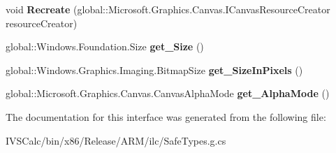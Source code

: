 \begin{DoxyCompactItemize}
void {\bfseries Recreate} (global\+::\+Microsoft.\+Graphics.\+Canvas.\+I\+Canvas\+Resource\+Creator resource\+Creator)
\item 
\mbox{\label{interface_microsoft_1_1_graphics_1_1_canvas_1_1_u_i_1_1_xaml_1_1_i_canvas_virtual_image_source_a8df57b04f7854479d8d5b4d90588a89a}} 
global\+::\+Windows.\+Foundation.\+Size {\bfseries get\+\_\+\+Size} ()
\item 
\mbox{\label{interface_microsoft_1_1_graphics_1_1_canvas_1_1_u_i_1_1_xaml_1_1_i_canvas_virtual_image_source_a94da0f764a564d73c97f33b5fba21363}} 
global\+::\+Windows.\+Graphics.\+Imaging.\+Bitmap\+Size {\bfseries get\+\_\+\+Size\+In\+Pixels} ()
\item 
\mbox{\label{interface_microsoft_1_1_graphics_1_1_canvas_1_1_u_i_1_1_xaml_1_1_i_canvas_virtual_image_source_ad058825143b5833f46d4cf80295da832}} 
global\+::\+Microsoft.\+Graphics.\+Canvas.\+Canvas\+Alpha\+Mode {\bfseries get\+\_\+\+Alpha\+Mode} ()
\end{DoxyCompactItemize}


The documentation for this interface was generated from the following file\+:\begin{DoxyCompactItemize}
\item 
I\+V\+S\+Calc/bin/x86/\+Release/\+A\+R\+M/ilc/Safe\+Types.\+g.\+cs\end{DoxyCompactItemize}
